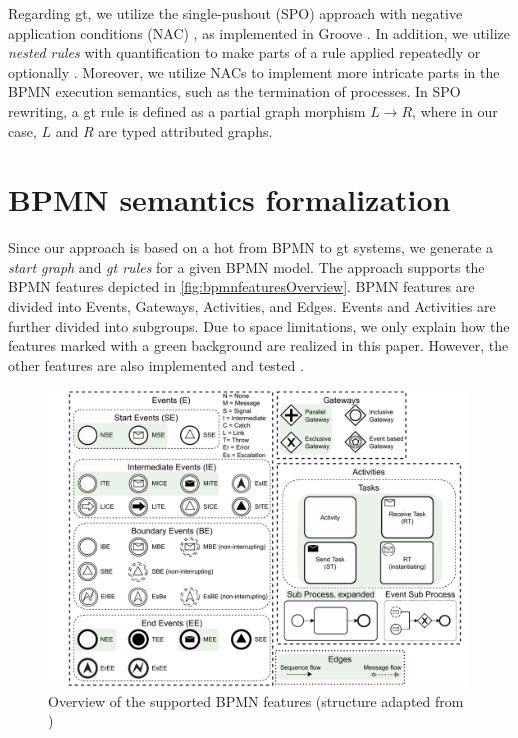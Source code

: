 \documentclass[runningheads]{llncs}
\begin{document}
Regarding \gls*{gt}, we utilize the single-pushout (SPO) approach with negative application conditions (NAC) \cite{ehrigALGEBRAICAPPROACHESGRAPH1997}, as implemented in Groove \cite{rensinkGROOVESimulatorTool2004}.
In addition, we utilize \emph{nested rules} with quantification to make parts of a rule applied repeatedly or optionally \cite{rensinkNestedQuantificationGraph2006,rensinkHowMuchAre2017}.
Moreover, we utilize NACs to implement more intricate parts in the BPMN execution semantics, such as the termination of processes. 
In SPO rewriting, a \gls*{gt} rule is defined as a partial graph morphism $L \to R$, where in our case, $L$ and $R$ are typed attributed graphs. 



\section{BPMN semantics formalization} \label{sec:formalization}

Since our approach is based on a \gls*{hot} from BPMN to \gls*{gt} systems, we generate a \emph{start graph} and \emph{\gls*{gt} rules} for a given BPMN model.
The approach supports the BPMN features depicted in \autoref{fig:bpmnfeaturesOverview}.
BPMN features are divided into \textsf{Events}, \textsf{Gateways}, \textsf{Activities}, and \textsf{Edges}.
\textsf{Events} and \textsf{Activities} are further divided into subgroups.
Due to space limitations, we only explain how the features marked with a green background are realized in this paper.
However, the other features are also implemented and tested \cite{krauterArtifactsICGT2023}.

\begin{figure}[ht]
    \centering
    \includegraphics[width=0.99\textwidth]{images/bpmn_semantics-feature-overview.pdf}
    \caption{Overview of the supported BPMN features (structure adapted from \cite{houhouFirstOrderLogicVerification2022})}
    \label{fig:bpmnfeaturesOverview}
\end{figure}
\end{document}
